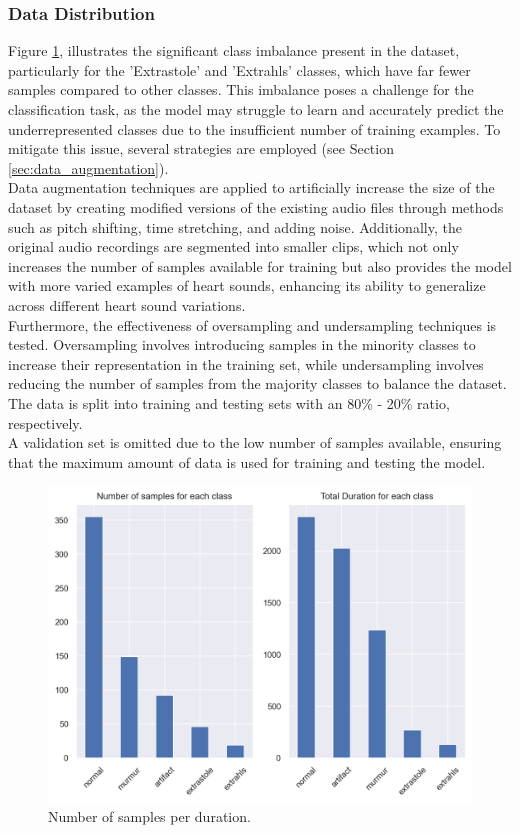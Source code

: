 \subsubsection*{Data Distribution} %
Figure \ref{fig:DataExp_num_durations}, illustrates the significant class imbalance present in the dataset, particularly for the 'Extrastole' and 'Extrahls' classes,
which have far fewer samples compared to other classes.
This imbalance poses a challenge for the classification task,
as the model may struggle to learn and accurately predict the underrepresented classes due to the insufficient number of training examples.
To mitigate this issue, several strategies are employed (see Section \ref{sec:data_augmentation}).\\
Data augmentation techniques are applied to artificially increase the size of the dataset
by creating modified versions of the existing audio files through methods such as pitch shifting, time stretching, and adding noise.
Additionally, the original audio recordings are segmented into smaller clips, which not only increases the number of samples available for training but
also provides the model with more varied examples of heart sounds, enhancing its ability to generalize across different heart sound variations.\\
Furthermore, the effectiveness of oversampling and undersampling techniques is tested. Oversampling involves introducing samples in the minority classes
to increase their representation in the training set, while undersampling involves reducing the number of samples from the majority classes
to balance the dataset. The data is split into training and testing sets with an 80\% - 20\% ratio, respectively.\\
A validation set is omitted due to the low number of samples available, ensuring that the maximum amount of data is used for training and testing the model.
\begin{figure}[h]
    \centering
    \includegraphics[width=\columnwidth]{./images/DataExp_num_durations.png}
    \caption{Number of samples per duration.}
    \label{fig:DataExp_num_durations}
\end{figure}

